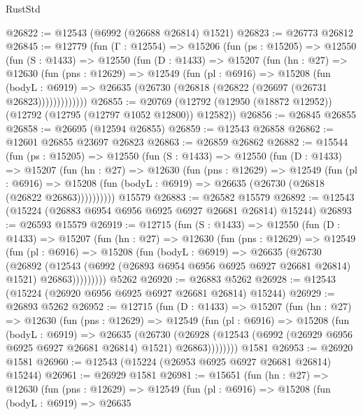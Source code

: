 \begin{lexlean}{RustStd}
\begin{coremodule}
@26822 := @12543 (@6992 (@26688 @26814) @1521)
@26823 := @26773 @26812
@26845 := @12779
    (fun (Γ : @12554) =>
    @15206
      (fun (ps : @15205) =>
      @12550
        (fun (S : @1433) =>
        @12550
          (fun (D : @1433) =>
          @15207
            (fun (hn : @27) =>
            @12630
              (fun (pns : @12629) =>
              @12549
                (fun (pl : @6916) =>
                @15208
                  (fun (bodyL : @6919) =>
                  @26635 (@26730 (@26818 (@26822 (@26697 (@26731 @26823)))))))))))))
@26855 := @20769 (@12792 (@12950 (@18872 @12952)) (@12792 (@12795 (@12797 @1052 @12800)) @12582))
@26856 := @26845 @26855
@26858 := @26695 (@12594 @26855)
@26859 := @12543 @26858
@26862 := @12601 @26855 @23697 @26823
@26863 := @26859 @26862
@26882 := @15544
    (fun (ps : @15205) =>
    @12550
      (fun (S : @1433) =>
      @12550
        (fun (D : @1433) =>
        @15207
          (fun (hn : @27) =>
          @12630
            (fun (pns : @12629) =>
            @12549
              (fun (pl : @6916) =>
              @15208 (fun (bodyL : @6919) => @26635 (@26730 (@26818 (@26822 @26863))))))))))
    @15579
@26883 := @26582 @15579
@26892 := @12543 (@15224 (@26883 @6954 @6956 @6925 @6927 @26681 @26814) @15244)
@26893 := @26593 @15579
@26919 := @12715
    (fun (S : @1433) =>
    @12550
      (fun (D : @1433) =>
      @15207
        (fun (hn : @27) =>
        @12630
          (fun (pns : @12629) =>
          @12549
            (fun (pl : @6916) =>
            @15208
              (fun (bodyL : @6919) =>
              @26635
                (@26730
                  (@26892
                    (@12543
                      (@6992 (@26893 @6954 @6956 @6925 @6927 @26681 @26814) @1521)
                      @26863)))))))))
    @5262
@26920 := @26883 @5262
@26928 := @12543 (@15224 (@26920 @6956 @6925 @6927 @26681 @26814) @15244)
@26929 := @26893 @5262
@26952 := @12715
    (fun (D : @1433) =>
    @15207
      (fun (hn : @27) =>
      @12630
        (fun (pns : @12629) =>
        @12549
          (fun (pl : @6916) =>
          @15208
            (fun (bodyL : @6919) =>
            @26635
              (@26730
                (@26928
                  (@12543 (@6992 (@26929 @6956 @6925 @6927 @26681 @26814) @1521) @26863))))))))
    @1581
@26953 := @26920 @1581
@26960 := @12543 (@15224 (@26953 @6925 @6927 @26681 @26814) @15244)
@26961 := @26929 @1581
@26981 := @15651
    (fun (hn : @27) =>
    @12630
      (fun (pns : @12629) =>
      @12549
        (fun (pl : @6916) =>
        @15208
          (fun (bodyL : @6919) =>
          @26635

\end{coremodule}
\end{lexlean}
